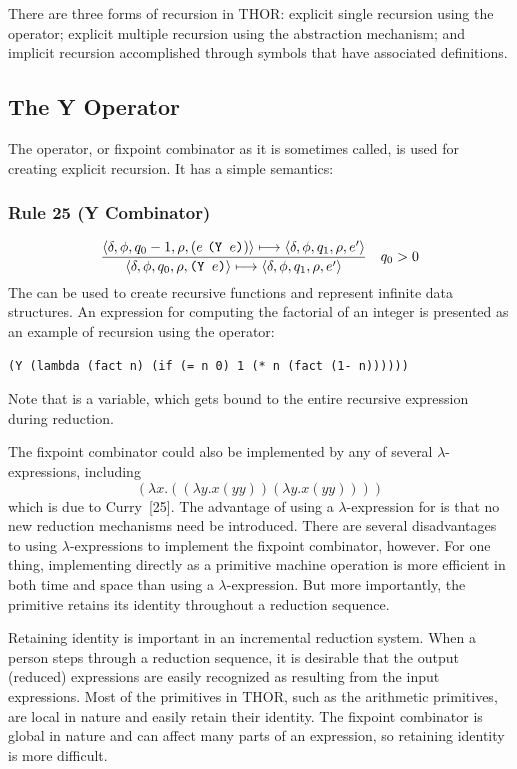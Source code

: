 There are three forms of recursion in THOR: explicit single recursion using the
 operator; explicit multiple recursion using the 
abstraction mechanism; and implicit recursion accomplished through symbols that
have associated definitions.

\subsection{The Y Operator}

The  operator, or fixpoint combinator as it is sometimes called, is used
for creating explicit recursion. It has a simple semantics:

\subsubsection*{Rule 25 (Y Combinator)}
\[
\frac{
\langle \delta,\phi,q_0-1,\rho,(e\ \texttt{(Y }e\texttt{)})\rangle\longmapsto
\langle \delta,\phi,q_1,\rho,e'\rangle
}{
\langle \delta,\phi,q_0,\rho,\texttt{(Y }e\texttt{)}\rangle\longmapsto
\langle \delta,\phi,q_1,\rho,e'\rangle
}
\quad q_0>0
\]
The  can be used to create recursive functions and represent infinite
data structures. An expression for computing the factorial of an integer is
presented as an example of recursion using the  operator:
\begin{verbatim}
(Y (lambda (fact n) (if (= n 0) 1 (* n (fact (1- n))))))
\end{verbatim}
Note that  is a variable, which gets bound to the entire recursive
expression during reduction.

The fixpoint combinator could also be implemented by any of several
\(\lambda\)-expressions, including
\[
(\lambda x.((\lambda y.x(yy))(\lambda y.x(yy))))
\]
which is due to Curry~[25]. The advantage of using a \(\lambda\)-expression for
 is that no new reduction mechanisms need be introduced. There are
several disadvantages to using \(\lambda\)-expressions to implement the fixpoint
combinator, however. For one thing, implementing  directly as a
primitive machine operation is more efficient in both time and space than using
a \(\lambda\)-expression. But more importantly, the  primitive retains
its identity throughout a reduction sequence.

Retaining identity is important in an incremental reduction system. When a
person steps through a reduction sequence, it is desirable that the output
(reduced) expressions are easily recognized as resulting from the input
expressions. Most of the primitives in THOR, such as the arithmetic primitives,
are local in nature and easily retain their identity. The fixpoint combinator is
global in nature and can affect many parts of an expression, so retaining
identity is more difficult.

